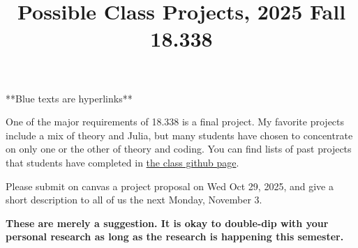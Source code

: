\documentclass{article}
\title{Possible Class Projects, 2025 Fall 18.338}
\begin{document}
\maketitle




{\color{blue} **Blue texts are hyperlinks**}


One of the major requirements of 18.338 is a final project.  My favorite projects include a mix of theory and Julia, but many students have chosen to concentrate
on only one or the other of theory and coding.  You can find lists of past projects that students have completed in \href{https://github.com/mitmath/18338#previous-projects}{\color{blue} the class github page}.  


Please submit on canvas a project proposal on Wed Oct 29, 2025, and give a short description to all of us the next Monday, November 3.

\textbf{These are merely a suggestion. It is okay to double-dip with your personal research as long as the research is happening this semester.}
\end{document}

